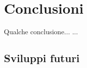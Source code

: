 \def\baselinestretch{1}
\chapter*{Conclusioni}
\graphicspath{{Chapter6/Chapter6Figs/PNG/}{Chapter6/Chapter6Figs/PDF/}{Chapter6/Chapter6Figs/}}

\def\baselinestretch{1.66}

Qualche conclusione... ...


\section{Sviluppi futuri}



